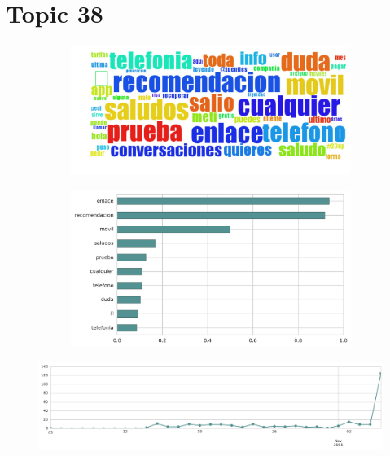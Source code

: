\section{Topic 38}

\begin{figure}[htbp!]
    \centering
    \begin{subfigure}[b]{0.49\textwidth}
        \includegraphics[width=\textwidth]{twitter_all/report_images/topic-38-wordcloud.jpg}
    \end{subfigure}
    \begin{subfigure}[b]{0.49\textwidth}
        \includegraphics[width=\textwidth]{twitter_all/report_images/topic-38-terms.jpg}
    \end{subfigure}
\end{figure}

\begin{figure}[htbp!]
    \centering
    \includegraphics[width=\textwidth]{twitter_all/report_images/topic-38-timeseries.jpg}
\end{figure}

